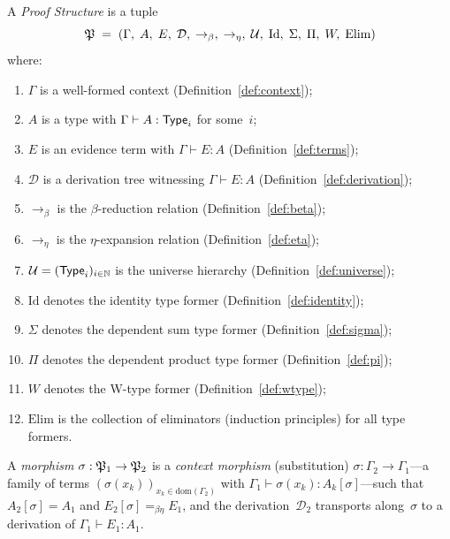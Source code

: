 \begin{definition}
\label{def:pstr}
A \emph{Proof Structure} is a tuple
\[
  \mathfrak{P} \;=\;
  (\Gamma,\; A,\; E,\; \mathcal{D},\; {\to_\beta},\;
  {\to_\eta},\; \mathcal{U},\;
  \mathrm{Id},\; \Sigma,\; \Pi,\; W,\; \mathrm{Elim})
\]
where:
\begin{enumerate}[label=(\roman*),nosep]
\item $\Gamma$ is a well-formed context (Definition~\ref{def:context});
\item $A$ is a type with $\Gamma \vdash A : \mathsf{Type}_i$ for some~$i$;
\item $E$ is an evidence term with $\Gamma \vdash E : A$
  (Definition~\ref{def:terms});
\item $\mathcal{D}$ is a derivation tree witnessing
  $\Gamma \vdash E : A$ (Definition~\ref{def:derivation});
\item $\to_\beta$ is the $\beta$-reduction relation
  (Definition~\ref{def:beta});
\item $\to_\eta$ is the $\eta$-expansion relation
  (Definition~\ref{def:eta});
\item $\mathcal{U} = (\mathsf{Type}_i)_{i \in \mathbb{N}}$ is the universe
  hierarchy (Definition~\ref{def:universe});
\item $\mathrm{Id}$ denotes the identity type former
  (Definition~\ref{def:identity});
\item $\Sigma$ denotes the dependent sum type former
  (Definition~\ref{def:sigma});
\item $\Pi$ denotes the dependent product type former
  (Definition~\ref{def:pi});
\item $W$ denotes the W-type former
  (Definition~\ref{def:wtype});
\item $\mathrm{Elim}$ is the collection of eliminators (induction
  principles) for all type formers.
\end{enumerate}
\end{definition}

\begin{definition}
\label{def:pstr-morph}
A \emph{morphism} $\sigma : \mathfrak{P}_1 \to \mathfrak{P}_2$ is a
\emph{context morphism} (substitution)
$\sigma : \Gamma_2 \to \Gamma_1$---a family of terms
$(\sigma(x_k))_{x_k \in \mathrm{dom}(\Gamma_2)}$ with
$\Gamma_1 \vdash \sigma(x_k) : A_k[\sigma]$---such that
$A_2[\sigma] = A_1$ and $E_2[\sigma] =_{\beta\eta} E_1$, and the
derivation~$\mathcal{D}_2$ transports along~$\sigma$ to a derivation
of $\Gamma_1 \vdash E_1 : A_1$.
\end{definition}

